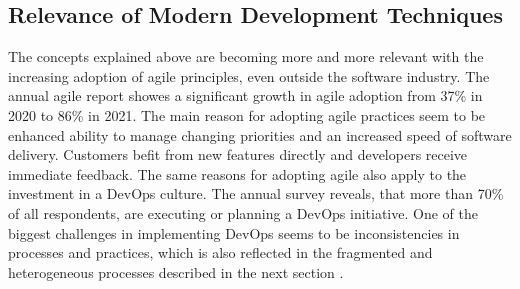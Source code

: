     \subsection{Relevance of Modern Development Techniques}
    The concepts explained above are becoming more and more relevant with the increasing adoption of agile principles, even outside the software industry. The annual agile report showes a significant growth in agile adoption from 37\% in 2020 to 86\% in 2021. The main reason for adopting agile practices seem to be enhanced ability to manage changing priorities and an increased speed of software delivery. Customers befit from new features directly and developers receive immediate feedback. The same reasons for adopting agile also apply to the investment in a DevOps culture. The annual survey reveals, that more than 70\% of all respondents, are executing or planning a DevOps initiative. One of the biggest challenges in implementing DevOps seems to be inconsistencies in processes and practices, which is also reflected in the fragmented and heterogeneous processes described in the next section \cite{agilereport2021}.
